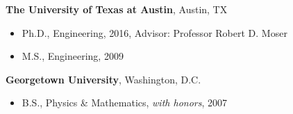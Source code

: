 %
\textbf{The University of Texas at Austin}, 
Austin, TX
\begin{itemize}

\item Ph.D., 
        Engineering, 2016, Advisor: Professor Robert D. Moser

\item M.S., 
      Engineering, 2009 

\end{itemize}

\textbf{Georgetown University}, 
Washington, D.C. 
\begin{itemize}

\item B.S., 
        Physics \& Mathematics, \emph{with honors}, 2007
\end{itemize}


